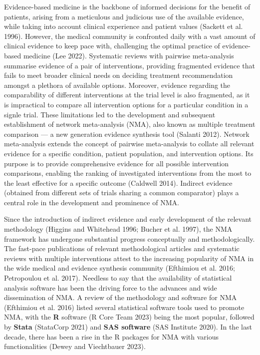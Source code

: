 Evidence-based medicine is the backbone of informed decisions for the benefit of
patients, arising from a meticulous and judicious use of the available evidence,
while taking into account clinical experience and patient values (Sackett et al. 1996).
However, the medical community is confronted daily with a vast amount of clinical evidence to keep pace with, challenging the optimal practice of evidence-based medicine (Lee 2022).
Systematic reviews with pairwise meta-analysis summarise evidence of a pair of
interventions, providing fragmented evidence that fails to meet broader clinical needs on deciding treatment recommendation amongst a plethora of available options.
Moreover, evidence regarding the comparability of different interventions at the trial
level is also fragmented, as it is impractical to compare all intervention options
for a particular condition in a signle trial. These limitations led to the development and subsequent
establishment of network meta-analysis (NMA), also known as multiple treatment
comparison — a new generation evidence synthesis tool (Salanti 2012). Network
meta-analysis extends the concept of pairwise meta-analysis to collate all relevant
evidence for a specific condition, patient population, and intervention
options. Its purpose is to provide comprehensive evidence for all possible intervention comparisons,
enabling the ranking of investigated interventions from the most to the least effective 
for a specific outcome (Caldwell 2014). Indirect evidence (obtained from different
sets of trials sharing a common comparator) plays a central role in the development
and prominence of NMA.

Since the introduction of indirect evidence and early development of the relevant
methodology (Higgins and Whitehead 1996; Bucher et al. 1997), the NMA framework has undergone substantial
progress conceptually and methodologically. The fast-pace publications of relevant
methodological articles and systematic reviews with multiple interventions attest
to the increasing popularity of NMA in the wide medical and evidence synthesis
community (Efthimiou et al. 2016; Petropoulou et al. 2017). Needless to say that the availability
of statistical analysis software has been the driving force to the advances and
wide dissemination of NMA. A review of the methodology and software for NMA
(Efthimiou et al. 2016) listed several statistical software tools used to promote NMA, with
the \textbf{R} software (R Core Team 2023) being the most popular, followed by \textbf{Stata} (StataCorp 2021)
and \textbf{SAS software} (SAS Institute 2020). In the last decade, there has been a rise in the
R packages for NMA with various functionalities (Dewey and Viechtbauer 2023).

